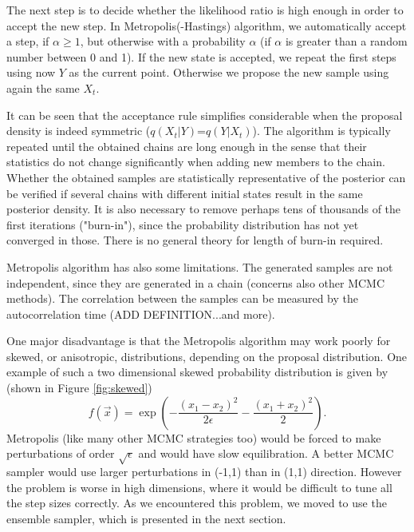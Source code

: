 \documentclass{wihuri}
\def\be{\begin{equation}}
\def\ee{\end{equation}}
\begin{document}
The next step is to decide whether the likelihood ratio is high enough in order to accept the new step. In Metropolis(-Hastings) algorithm, we automatically accept a step, if $\alpha \ge 1$, but otherwise with a probability $\alpha$ (if $\alpha$ is greater than a random number between 0 and 1). If the new state is accepted, we repeat the first steps using now $Y$ as the current point. Otherwise we propose the new sample using again the same $X_{t}$. 



It can be seen that the acceptance rule simplifies considerable when the
proposal density is indeed symmetric ($q(X_{t}|Y)$=$q(Y|X_{t})$). The algorithm is typically repeated until the obtained chains are long enough in the sense that their statistics do not change significantly when adding new members to the chain. Whether the obtained samples are statistically representative of the posterior can be verified if several chains with different initial states result in the same posterior density. It is also necessary to remove perhaps tens of thousands of the first iterations ("burn-in"), since the probability distribution has not yet converged in those. There is no general theory for length of burn-in required. 


Metropolis algorithm has also some limitations. The generated samples are not independent, since they are generated in a chain (concerns also other MCMC methods). The correlation between the samples can be measured by the autocorrelation time (ADD DEFINITION...and more). %

One major disadvantage is that the Metropolis algorithm may work poorly for skewed, or anisotropic, distributions, depending on the proposal distribution. One example of such a two dimensional skewed probability distribution is given by (shown in Figure \ref{fig:skewed})
\be \label{eq:skew} 
f(\vec{x}) = \exp(-\frac{(x_{1}-x_{2})^{2}}{2\epsilon}-\frac{(x_{1}+x_{2})^{2}}{2}).
\ee
Metropolis (like many other MCMC strategies too) would be forced to make perturbations of order $\sqrt{\epsilon}$ and would have slow equilibration. A better MCMC sampler would use larger perturbations in (-1,1) than in (1,1) direction. However the problem is worse in high dimensions, where it would be difficult to tune all the step sizes correctly. As we encountered this problem, we  moved to use the ensemble sampler, which is presented in the next section. 
\end{document}
